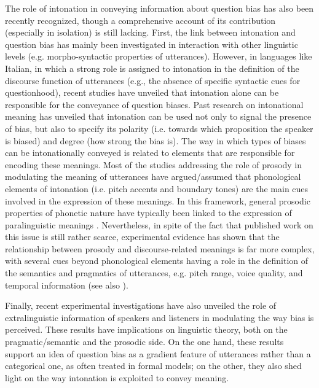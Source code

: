 \documentclass[output=paper,colorlinks,citecolor=brown]{langscibook}
\begin{document}
The role of intonation in conveying information about question bias has also been recently recognized, though a comprehensive account of its contribution (especially in isolation) is still lacking. First, the link between intonation and question bias has mainly been investigated in interaction with other linguistic levels (e.g. morpho-syntactic properties of utterances). However, in languages like Italian, in which a strong role is assigned to intonation in the definition of the discourse function of utterances (e.g., the absence of specific syntactic cues for questionhood), recent studies have unveiled that intonation alone can be responsible for the conveyance of question biases. Past research on intonational meaning has unveiled that intonation can be used not only to signal the presence of bias, but also to specify its polarity (i.e. towards which proposition the speaker is biased) and degree (how strong the bias is). The way in which types of biases can be intonationally conveyed is related to elements that are responsible for encoding these meanings. Most of the studies addressing the role of prosody in modulating the meaning of utterances have argued/assumed that phonological elements of intonation (i.e. pitch accents and boundary tones) are the main cues involved in the expression of these meanings. In this framework, general prosodic properties of phonetic nature have typically been linked to the expression of paralinguistic meanings \citep[see, for example, the treatment of pitch range by][]{LibermanPierrehumbert84}. Nevertheless, in spite of the fact that published work on this issue is still rather scarce, experimental evidence has shown that the relationship between prosody and discourse-related meanings is far more complex, with several cues beyond phonological elements having a role in the definition of the semantics and pragmatics of utterances, e.g. pitch range, voice quality, and temporal information (see also ).

Finally, recent experimental investigations have also unveiled the role of extralinguistic information of speakers and listeners in modulating the way bias is perceived. These results have implications on linguistic theory, both on the pragmatic/semantic and the prosodic side. On the one hand, these results support an idea of question bias as a gradient feature of utterances rather than a categorical one, as often treated in formal models; on the other, they also shed light on the way intonation is exploited to convey meaning.
\end{document}
